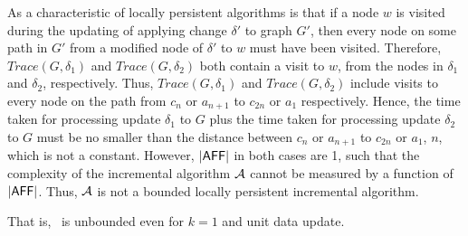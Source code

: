 As a characteristic of locally persistent algorithms is that if a node $w$ is visited during the updating of applying change $\delta'$ to graph $G'$,
then every node on some path in $G'$ from a modified node of $\delta'$ to $w$ must have been visited.
Therefore, $Trace(G, \delta_1)$ and $Trace(G, \delta_2)$ both contain a visit to $w$,
from the nodes in $\delta_1$ and $\delta_2$, respectively.
Thus, $Trace(G, \delta_1)$ and $Trace(G, \delta_2)$ include visits to every node on the path from $c_n$ or $a_{n+1}$ to $c_{2n}$ or $a_1$ respectively.
Hence, the time taken for processing update $\delta_1$ to $G$ plus the time taken for processing update $\delta_2$ to $G$ must be no smaller than the distance between $c_n$ or $a_{n+1}$ to $c_{2n}$ or $a_1$, \ie $n$, which is not a constant.
However, $|{\mathsf{AFF}}|$ in both cases are 1, such that the complexity of the incremental algorithm ${\cal A}$ cannot be measured by a function of $|{\mathsf{AFF}}|$.
Thus, ${\cal A}$ is not a bounded locally persistent incremental algorithm.

\vspace{-1.0ex}
That is, \dynteamF\, is unbounded even for $k=1$ and unit data update.


